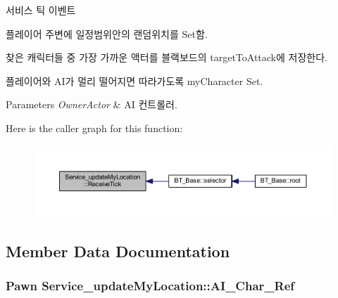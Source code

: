 서비스 틱 이벤트 

플레이어 주변에 일정범위안의 랜덤위치를 Set함.

찾은 캐릭터들 중 가장 가까운 액터를 블랙보드의 target\+To\+Attack에 저장한다.

플레이어와 A\+I가 멀리 떨어지면 따라가도록 my\+Character Set. 
\begin{DoxyParams}{Parameters}
{\em Owner\+Actor} & AI 컨트롤러. \\
\hline
\end{DoxyParams}


Here is the caller graph for this function\+:
\nopagebreak
\begin{figure}[H]
\begin{center}
\leavevmode
\includegraphics[width=350pt]{class_service__update_my_location_a2c2f90d92234520772c3a0108f148626_icgraph}
\end{center}
\end{figure}




\subsection{Member Data Documentation}
\subsubsection[{\texorpdfstring{A\+I\+\_\+\+Char\+\_\+\+Ref}{AI_Char_Ref}}]{\setlength{\rightskip}{0pt plus 5cm}Pawn Service\+\_\+update\+My\+Location\+::\+A\+I\+\_\+\+Char\+\_\+\+Ref\hspace{0.3cm}{\ttfamily [private]}}\hypertarget{class_service__update_my_location_a6d13896af22d8464dc24800bfd498c8a}{}\label{class_service__update_my_location_a6d13896af22d8464dc24800bfd498c8a}

